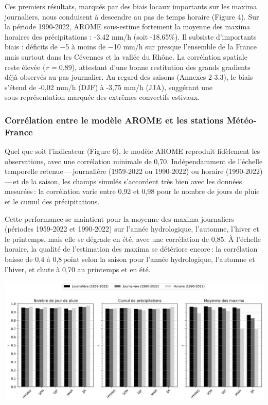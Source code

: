 \documentclass[
  article,
  nofooter,
  noheadings]{jss}
\begin{document}
\hfill\break

Ces premiers résultats, marqués par des biais locaux importants sur les
maxima journaliers, nous conduisent à descendre au pas de temps horaire
(Figure 4). Sur la période 1990-2022, AROME sous-estime fortement la
moyenne des maxima horaires des précipitations : -3.42 mm/h (soit
-18.65\%). Il subsiste d'importants biais : déficits de −5 à moins de
−10 mm/h sur presque l'ensemble de la France mais surtout dans les
Cévennes et la vallée du Rhône. La corrélation spatiale reste élevée
(\emph{r =} 0.89), attestant d'une bonne restitution des grands
gradients déjà observés au pas journalier. Au regard des saisons
(Annexes 2-3.3), le biais s'étend de -0,02 mm/h (DJF) à -3,75 mm/h
(JJA), suggérant une sous‑représentation marquée des extrêmes convectifs
estivaux.

\subsubsection{Corrélation entre le modèle AROME et les stations
Météo-France}\label{corruxe9lation-entre-le-moduxe8le-arome-et-les-stations-muxe9tuxe9o-france}

Quel que soit l'indicateur (Figure 6), le modèle AROME reproduit
fidèlement les observations, avec une corrélation minimale de 0,70.
Indépendamment de l'échelle temporelle retenue\,---\,journalière
(1959‑2022 ou 1990‑2022) ou horaire (1990‑2022)\,---\,et de la saison,
les champs simulés s'accordent très bien avec les données mesurées\,: la
corrélation varie entre 0,92 et 0,98 pour le nombre de jours de pluie et
le cumul des précipitations.

Cette performance se maintient pour la moyenne des maxima journaliers
(périodes 1959‑2022 et 1990‑2022) sur l'année hydrologique, l'automne,
l'hiver et le printemps, mais elle se dégrade en été, avec une
corrélation de 0,85. À l'échelle horaire, la qualité de l'estimation des
maxima se détériore encore\,: la corrélation baisse de 0,4 à 0,8\,point
selon la saison pour l'année hydrologique, l'automne et l'hiver, et
chute à 0,70 au printemps et en été.

\includegraphics[width=1\linewidth,height=\textheight,keepaspectratio]{figures/histo_numday_mean_mean-max.png}
\end{document}
